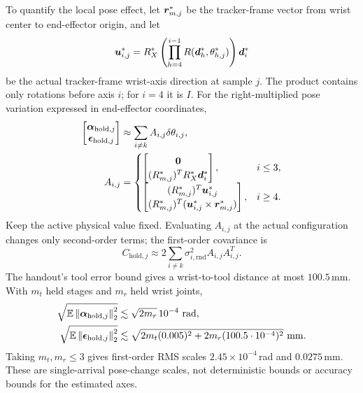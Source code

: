 \documentclass[../main.tex]{subfiles}
\begin{document}
To quantify the local pose effect, let $\bm{r}_{m,j}^*$ be the tracker-frame vector from wrist center to end-effector origin, and let
\begin{equation*}
\bm{u}_{i,j}^*=R_X^*\left(\prod_{h=4}^{i-1}R(\bm{d}_h^*,\theta^*_{h,j})\right)\bm{d}_i^*
\end{equation*}
be the actual tracker-frame wrist-axis direction at sample $j$. The product contains only rotations before axis $i$; for $i=4$ it is $I$. For the right-multiplied pose variation expressed in end-effector coordinates,
\begin{equation}\label{eq:held-pose-jacobian}
\begin{aligned}
\begin{bmatrix}\bm{\alpha}_{\mathrm{hold},j}\\\bm{\epsilon}_{\mathrm{hold},j}\end{bmatrix}
&\approx\sum_{i\ne k}A_{i,j}\delta\theta_{i,j},\\
A_{i,j}&=\begin{cases}
\begin{bmatrix}\bm{0}\\(R_{m,j}^*)^TR_X^*\bm{d}_i^*\end{bmatrix},&i\leq3,\\[4pt]
\begin{bmatrix}(R_{m,j}^*)^T\bm{u}_{i,j}^*\\(R_{m,j}^*)^T(\bm{u}_{i,j}^*\times\bm{r}_{m,j}^*)\end{bmatrix},&i\geq4.
\end{cases}
\end{aligned}
\end{equation}
Keep the active physical value fixed. Evaluating $A_{i,j}$ at the actual configuration changes only second-order terms; the first-order covariance is
\begin{equation}\label{eq:held-pose-covariance}
C_{\mathrm{hold},j}\approx2\sum_{i\ne k}\sigma_{i,\mathrm{rnd}}^2A_{i,j}A_{i,j}^T.
\end{equation}
The handout's tool error bound gives a wrist-to-tool distance at most $100.5$\,mm. With $m_t$ held stages and $m_r$ held wrist joints,
\begin{equation}\label{eq:held-noise-scale}
\begin{aligned}
\sqrt{\mathbb E\norm{\vct{\alpha}_{\mathrm{hold},j}}^2}&\lesssim\sqrt{2m_r}\,10^{-4}\ \mathrm{rad},\\
\sqrt{\mathbb E\norm{\vct{\epsilon}_{\mathrm{hold},j}}^2}&\lesssim\sqrt{2m_t(0.005)^2+2m_r(100.5\cdot10^{-4})^2}\ \mathrm{mm}.
\end{aligned}
\end{equation}
Taking $m_t,m_r\leq3$ gives first-order RMS scales $2.45\times10^{-4}$\,rad and $0.0275$\,mm. These are single-arrival pose-change scales, not deterministic bounds or accuracy bounds for the estimated axes.
\end{document}
